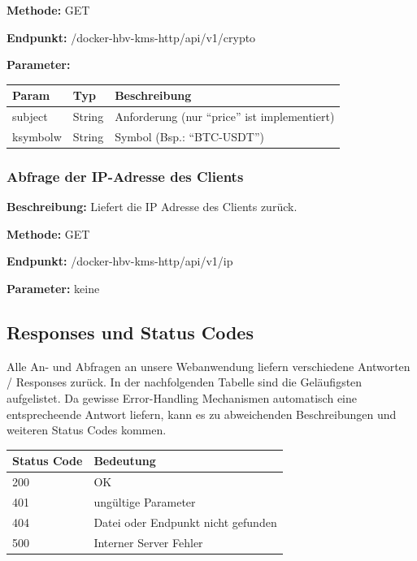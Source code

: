 \textbf{Methode:} GET

\textbf{Endpunkt:} /docker-hbv-kms-http/api/v1/crypto

\textbf{Parameter:}
\begin{table}[H]
    \label{table:/docker-hbv-kms-http/api/v1/crypto}
    \setlength{\tabcolsep}{3pt}
    \begin{tabular}{p{100pt}p{80pt}p{200pt}}
        \hline
        Param    & Typ    & Beschreibung                                  \\
        \hline
        subject  & String & Anforderung (nur ``price'' ist implementiert) \\
        ksymbolw & String & Symbol (Bsp.: ``BTC-USDT'')                   \\
        \hline
    \end{tabular}
\end{table}
\dotfill

\subsubsection{Abfrage der IP-Adresse des Clients}
\label{sec:api-client-ip}
\textbf{Beschreibung:} Liefert die IP Adresse des Clients zurück.

\textbf{Methode:} GET

\textbf{Endpunkt:} /docker-hbv-kms-http/api/v1/ip

\textbf{Parameter:} keine

\dotfill


\subsection{Responses und Status Codes}
\label{sec:nodechapter-implementation-responses}
Alle An- und Abfragen an unsere Webanwendung liefern verschiedene Antworten / Responses zurück. In der nachfolgenden Tabelle
sind die Geläufigsten aufgelistet. Da gewisse Error-Handling Mechanismen automatisch eine entsprecheende Antwort liefern,
kann es zu abweichenden Beschreibungen und weiteren Status Codes kommen.
\begin{table}[H]
    \label{table:responsecodes}
    \setlength{\tabcolsep}{3pt}
    \begin{tabular}{p{100pt}p{280pt}}
        \hline
        Status Code & Bedeutung                          \\
        \hline
        200         & OK                                 \\
        401         & ungültige Parameter                \\
        404         & Datei oder Endpunkt nicht gefunden \\
        500         & Interner Server Fehler             \\
        \hline
    \end{tabular}
\end{table}


